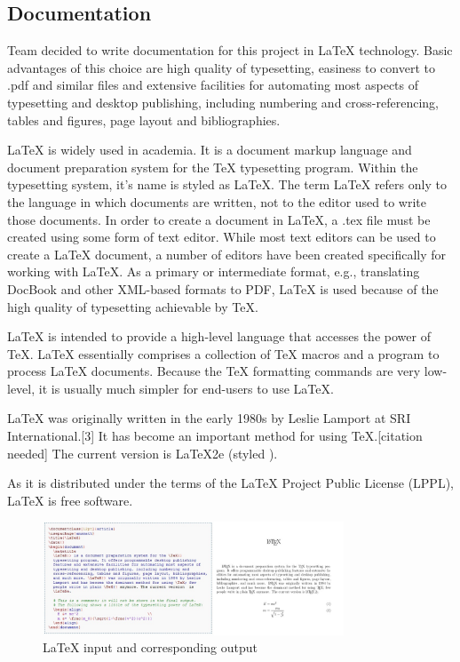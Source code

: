 \subsection{Documentation}

Team decided to write documentation for this project in LaTeX technology. Basic advantages of this choice are high quality of typesetting, easiness to convert to .pdf and similar files and extensive facilities for automating most aspects of typesetting and desktop publishing, including numbering and cross-referencing, tables and figures, page layout and bibliographies.

LaTeX is widely used in academia. It is a document markup language and document preparation system for the TeX typesetting program. Within the typesetting system, it's name is styled as \LaTeX. The term LaTeX refers only to the language in which documents are written, not to the editor used to write those documents. In order to create a document in LaTeX, a .tex file must be created using some form of text editor. While most text editors can be used to create a LaTeX document, a number of editors have been created specifically for working with LaTeX. As a primary or intermediate format, e.g., translating DocBook and other XML-based formats to PDF, LaTeX is used because of the high quality of typesetting achievable by TeX.

LaTeX is intended to provide a high-level language that accesses the power of TeX. LaTeX essentially comprises a collection of TeX macros and a program to process LaTeX documents. Because the TeX formatting commands are very low-level, it is usually much simpler for end-users to use LaTeX.

LaTeX was originally written in the early 1980s by Leslie Lamport at SRI International.[3] It has become an important method for using TeX.[citation needed] The current version is LaTeX2e (styled \LaTeXe).

As it is distributed under the terms of the LaTeX Project Public License (LPPL), LaTeX is free software.

\begin{figure}[htb]
	\centering
	\includegraphics[width=0.8\textwidth]{prestudy/latex.JPG}
	\caption{LaTeX input and corresponding output}
	\label{fig:latex}
\end{figure}

